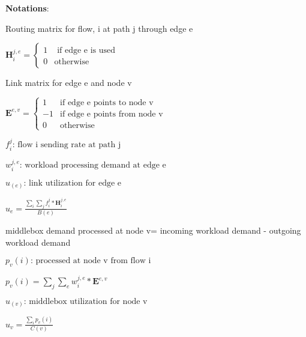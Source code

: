 \documentclass{sig-alternate}
\begin{document}
\begin{framed}
\textbf{Notations}:
\newline

Routing matrix for flow, i at path j through edge e
\newline

$\boldsymbol{H}_i^{j, e} = 
\begin{cases} 
1 & \text{ if edge e is used} \\ 
0 & \text{otherwise} \end{cases} $
\newline

Link matrix for edge e and node v
\newline

$\boldsymbol{E}^{e, v} = 
\begin{cases}
1 & \text{if edge e points to node v} \\
-1 & \text{if edge e points from node v} \\
0 & \text{otherwise}
\end{cases} $
\newline


$f_i^j \text{: flow i sending rate at path j} $
\newline

$w_i^{j, e} \text{: workload processing demand at edge e}$
\newline

$u_(e)\text{: link utilization for edge e } $
\newline

$u_{e} = \frac{\sum\limits_{i}\sum\limits_{j} f_i^j*\boldsymbol{H}_i^{j, e} } {B(e)}$
\newline

middlebox demand processed at node v= incoming workload demand - outgoing workload demand 
\newline

$p_v(i) \text{: processed at node v from flow i} $
\newline

$p_v(i) = \sum\limits_j \sum\limits_e w_i^{j,e}*\boldsymbol{E}^{e,v}  $
\newline

$u_(v) \text{: middlebox utilization for node v}$
\newline

$u_{v} = \frac{ \sum\limits_{i} p_v(i) } {C(v)} $ 
\newline

\end{framed}
\end{document}

